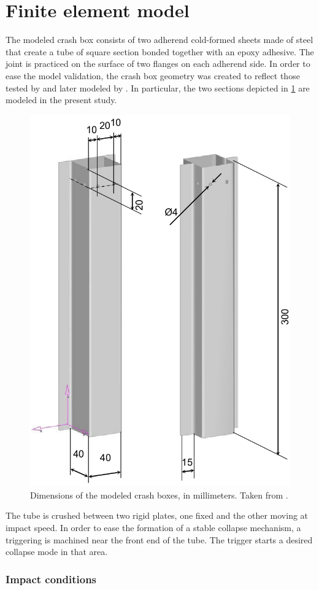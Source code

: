 \documentclass[cmfonts]{witpress}
\begin{document}
\section{Finite element model}
The modeled crash box consists of two adherend cold-formed sheets made of steel that create a tube of square section bonded together with an epoxy adhesive. The joint is practiced on the surface of two flanges on each adherend side. In order to ease the model validation, the crash box geometry was created to reflect those tested by \cite{Peroni2009} and later modeled by \cite{Scattina2011}. In particular, the two sections depicted in \cref{fig:crash_box} are modeled in the present study.

\begin{figure}[htpb]
	\centering
	\includegraphics[width=0.6\linewidth]{figures/IMG_CUTRES/medidas_cb}
	\caption{Dimensions of the modeled crash boxes, in millimeters. Taken from \cite{Peroni2009}.}
	\label{fig:crash_box}
\end{figure}


The tube is crushed between two rigid plates, one fixed and the other moving at impact speed. In order to ease the formation of a stable collapse mechanism, a triggering is machined near the front end of the tube. The trigger starts a desired collapse mode in that area.

\subsubsection{Impact conditions} %
\label{sec:impact}
\end{document}
